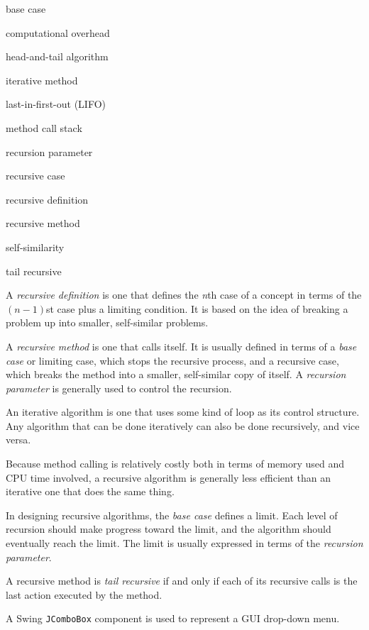 \pagebreak
{}


\begin{KT}
base case

computational overhead

head-and-tail algorithm

iterative method

last-in-first-out (LIFO)

method call stack

recursion parameter

recursive case

recursive definition

recursive method

self-similarity

tail recursive

\end{KT}



\begin{SMBL}
\item  A {\it recursive definition} is one that defines the
{\it n}th case of a concept in terms of the $(n-1)$st
case plus a limiting condition.   It is based on the idea of breaking a
problem up into smaller, self-similar problems.

\item  A {\it recursive method} is one that calls itself.
It is usually defined in terms of a {\it base case} or limiting case,
which stops the recursive process, and a recursive case, which breaks
the method into a smaller, self-similar copy of itself.   A {\it
recursion parameter} is generally used to control the recursion.

\item  An iterative algorithm is one that uses some kind of loop
as its control structure.  Any algorithm that can be done iteratively
can also be done recursively, and vice versa.


\item  Because method calling is relatively costly both in terms
of memory used and CPU time involved, a recursive algorithm
is generally less efficient than an iterative one that does the same
thing.

\item  In designing recursive algorithms, the {\it base case} defines
a limit.  Each level of recursion should make progress toward
the limit, and the algorithm should eventually reach the limit.
The limit is usually expressed in terms of the {\it recursion parameter}.

\item  A recursive method is {\it tail recursive} if and only if
each of its recursive calls is the last action executed by the
method.

\item  A Swing {\tt JComboBox} component is used to represent
a GUI drop-down menu.
\end{SMBL}

